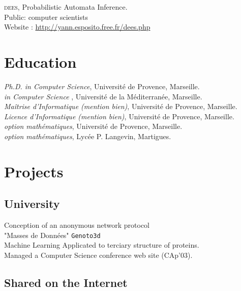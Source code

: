 \textsc{dees}, Probabilistic Automata Inference.\\
{\footnotesize \phantom{espace}Public: computer scientists}\\
{\footnotesize \phantom{espace}Website : \href{http://yann.esposito.free.fr/dees.php}{http://yann.esposito.free.fr/dees.php}}

\section*{Education}

\noindent{}\emph{Ph.D. in Computer Science}, Université de Provence, Marseille.\\
\noindent{}\emph{ in Computer Science} , Université de la Méditerranée, Marseille.\\
\noindent{}\emph{Maîtrise d'Informatique {\footnotesize(mention bien)}}, Université de Provence, Marseille.\\
\noindent{}\emph{Licence d'Informatique {\footnotesize(mention bien)}}, Université de Provence, Marseille.\\
\noindent{}\emph{ {\footnotesize option mathématiques}}, Université de Provence, Marseille.\\
\noindent{}\emph{ {\footnotesize option mathématiques}}, Lycée P. Langevin, Martigues.

\section*{Projects}

\subsection*{University}

\noindent{}Conception of an anonymous network protocol\\
 "Masses de Données" \texttt{Genoto3d}\\
{\phantom{es}\footnotesize Machine Learning Applicated to terciary structure of proteins.}\\
Managed a Computer Science conference web site (CAp'03).

\subsection*{Shared on the Internet}

